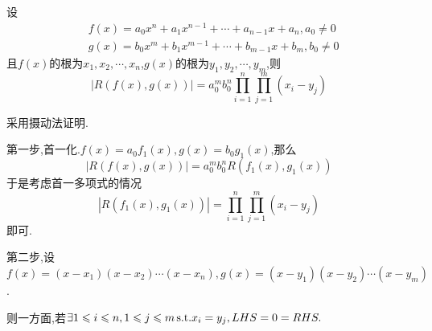 \begin{formal}
\begin{theorem}[结式的根表示]\label{thm:结式的根表示}
    设
    \begin{align*}
        &f\left(x\right)=a_0x^n +a_1x^{n-1}+\cdots+a_{n-1}x+a_n,a_0\neq 0\\
        &g\left(x\right)=b_0x^m+b_1x^{m-1}+\cdots+b_{m-1}x+b_m,b_0\neq 0
    \end{align*}
    且$f\left(x\right)$的根为$x_1,x_2,\cdots,x_n$,$g\left(x\right)$的根为$y_1,y_2,\cdots,y_m$,则
    \[\left|
    R\left(f\left(x\right),g\left(x\right)\right)\right|=
    a_0^mb_0^n\prod_{i=1}^{n}\prod_{j=1}^{m}\left(
        x_i-y_j
    \right)
    \]
\end{theorem}
\begin{Proof}
采用摄动法证明.

第一步,首一化.$f\left(x\right)=a_0f_1\left(x\right),g\left(x\right)=b_0g_1\left(x\right)$,那么
\[\left|
R\left(f\left(x\right),g\left(x\right)\right)\right|=
a_0^mb_0^nR\left(f_1\left(x\right),g_1\left(x\right)\right)
\]于是考虑首一多项式的情况
\[\left|
R\left(f_1\left(x\right),g_1\left(x\right)\right)\right|
=
 \prod_{i=1}^{n}\prod_{j=1}^{m}\left(
        x_i-y_j
    \right)
\]
即可.

第二步,设$f\left(x\right)=\left(x-x_1\right)
\left(x-x_2\right)\cdots\left(x-x_n\right),g\left(x\right)=\left(x-y_1\right)
\left(x-y_2\right)\cdots\left(x-y_m\right)$.

则一方面,若$\exists 1\leqslant i\leqslant n,1\leqslant j\leqslant m\,\textup{s.t.}x_i=y_j,LHS=0=RHS.$


\end{Proof}
\end{formal}
